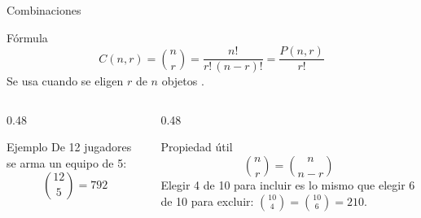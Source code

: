 \documentclass[aspectratio=169,10pt]{beamer}
\begin{document}
\begin{frame}{Combinaciones}
  \begin{block}{Fórmula}
    \[ C(n,r)=\binom{n}{r}=\frac{n!}{r!\,(n-r)!}
       = \frac{P(n,r)}{r!} \]
    Se usa cuando se eligen $r$ de $n$ objetos .
  \end{block}

  \vspace{0.2cm}
  \begin{columns}[T,onlytextwidth]
    \begin{column}{0.48\textwidth}
      \begin{exampleblock}{Ejemplo}
        \footnotesize
        De 12 jugadores se arma un equipo de 5:
        \[ \binom{12}{5}=792 \]
      \end{exampleblock}
    \end{column}
    \begin{column}{0.48\textwidth}
      \begin{alertblock}{Propiedad útil}
        \footnotesize
        \[ \binom{n}{r}=\binom{n}{n-r} \]
        Elegir 4 de 10 para incluir es lo mismo que elegir 6 de 10 para
        excluir: $\binom{10}{4}=\binom{10}{6}=210$.
      \end{alertblock}
    \end{column}
  \end{columns}
\end{frame}
\end{document}
